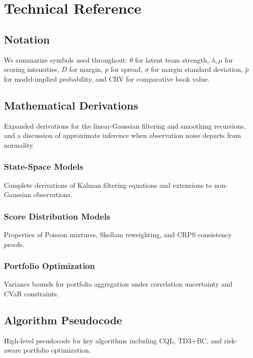 
\chapter{Technical Reference}

\section{Notation}
We summarize symbols used throughout: $\theta$ for latent team strength, $\lambda,\mu$ for scoring intensities, $D$ for margin, $p$ for spread, $\sigma$ for margin standard deviation, $\hat p$ for model-implied probability, and CBV for comparative book value.

\section{Mathematical Derivations}
Expanded derivations for the linear-Gaussian filtering and smoothing recursions, and a discussion of approximate inference when observation noise departs from normality.

\subsection{State-Space Models}
Complete derivations of Kalman filtering equations and extensions to non-Gaussian observations.

\subsection{Score Distribution Models}
Properties of Poisson mixtures, Skellam reweighting, and CRPS consistency proofs.

\subsection{Portfolio Optimization}
Variance bounds for portfolio aggregation under correlation uncertainty and CVaR constraints.

\section{Algorithm Pseudocode}
High-level pseudocode for key algorithms including CQL, TD3+BC, and risk-aware portfolio optimization.

